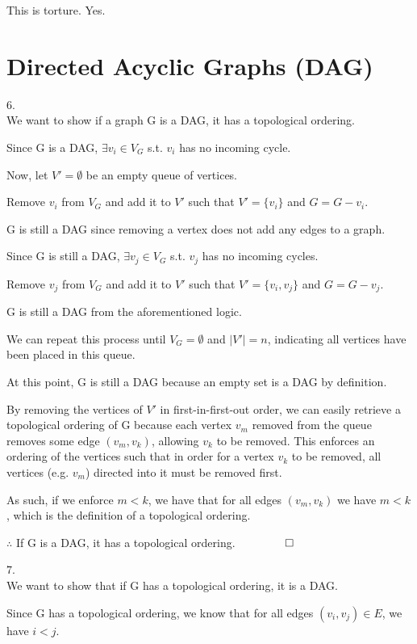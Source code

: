\documentclass[11pt,english]{article}
\begin{document}
	This is torture. Yes.
	\pagebreak
	
\section{Directed Acyclic Graphs (DAG)}

$6.$\\

We want to show if a graph G is a DAG, it has a topological ordering.

Since G is a DAG, $\exists v_i \in V_G$ s.t. $v_i$ has no incoming cycle.

Now, let $V' = \emptyset$ be an empty queue of vertices.

Remove $v_i$ from $V_G$ and add it to $V'$ such that $V' = \{v_i\}$ and $G = G - v_i$.

G is still a DAG since removing a vertex does not add any edges to a graph.

Since G is still a DAG, $\exists v_j \in V_G$ s.t. $v_j$ has no incoming cycles.

Remove $v_j$ from $V_G$ and add it to $V'$ such that $V' = \{v_i, v_j\}$ and $G = G - v_j$.

G is still a DAG from the aforementioned logic.

We can repeat this process until $V_G = \emptyset$ and $\vert V'\vert = n$, indicating all vertices have been placed in this queue.

At this point, G is still a DAG because an empty set is a DAG by definition.

By removing the vertices of $V'$ in first-in-first-out order, we can easily retrieve a topological ordering of G because each vertex $v_m$ removed from the queue removes some edge $(v_m, v_k)$, allowing $v_k$ to be removed. This enforces an ordering of the vertices such that in order for a vertex $v_k$ to be removed, all vertices (e.g. $v_m$) directed into it must be removed first.

As such, if we enforce $m < k$, we have that for all edges $(v_m, v_k)$ we have $m < k$, which is the definition of a topological ordering.

$\therefore$ If G is a DAG, it has a topological ordering. $\qquad \qed$\\
\pagebreak

$7.$\\

We want to show that if G has a topological ordering, it is a DAG.

Since G has a topological ordering, we know that for all edges $(v_i, v_j) \in E$, we have $i < j$.
\end{document}
